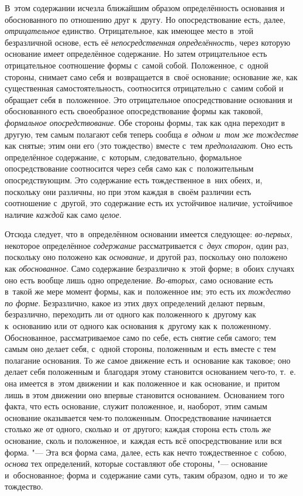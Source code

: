 В~этом содержании исчезла ближайшим образом определённость основания и
обоснованного по отношению друг к~другу. Но опосредствование есть, далее,
{\em отрицательное} единство. Отрицательное, как имеющее место в~этой
безразличной основе, есть её {\em непосредственная определённость,} через
которую основание имеет определённое содержание. Но затем отрицательное есть
отрицательное соотношение формы с~самой собой. Положенное, с~одной стороны,
снимает само себя и~возвращается в~своё основание; основание же, как
существенная самостоятельность, соотносится отрицательно с~самим собой и
обращает себя в~положенное. Это отрицательное опосредствование основания и
обоснованного есть своеобразное опосредствование формы как таковой,
{\em формальное опосредствование}. Обе стороны формы, так как одна переходит в
другую, тем самым полагают себя теперь сообща {\em в~одном и~том же тождестве}
как снятые; этим они его (это тождество) вместе с~тем {\em предполагают}. Оно
есть определённое содержание, с~которым, следовательно, формальное
опосредствование соотносится через себя само как с~положительным
опосредствующим. Это содержание есть тождественное в~них обеих, и, поскольку
они различны, но при этом каждая в~своём различии есть соотношение с~другой,
это содержание есть их устойчивое наличие, устойчивое наличие {\em каждой} как
само {\em целое}.

Отсюда следует, что в~определённом основании имеется следующее:
{\em во-первых,} некоторое определённое {\em содержание} рассматривается
с~{\em двух сторон,} один раз, поскольку оно положено как {\em основание,} и
другой раз, поскольку оно положено как {\em обоснованное}. Само содержание
безразлично к~этой форме; в~обоих случаях оно есть вообще лишь одно
определение. {\em Во-вторых,} само основание есть в~такой же мере момент формы,
как и~положенное им; это есть их {\em тождество по форме}. Безразлично, какое
из этих двух определений делают первым, безразлично, переходить ли от одного
как положенного к~другому как к~основанию или от одного как основания к~другому
как к~положенному. Обоснованное, рассматриваемое само по себе, есть снятие себя
самого; тем самым оно делает себя, с~одной стороны, положенным и~есть вместе с
тем полагание основания. То же самое движение есть и~основание как таковое; оно
делает себя положенным и~благодаря этому становится основанием чего-то, т.~е.
она имеется в~этом движении и~как положенное и~как основание, и~притом лишь в
этом движении оно впервые становится основанием. Основанием того факта, что
есть основание, служит положенное, и, наоборот, этим самым основание
оказывается чем-то положенным. Опосредствование начинается столько же от
одного, сколько и~от другого; каждая сторона есть столь же основание, сколь и
положенное, и~каждая есть всё опосредствование или вся форма. "--- Эта вся
форма сама, далее, есть как нечто тождественное с~собою, {\em основа} тех
определений, которые составляют обе стороны, "--- основание и~обоснованное;
форма и~содержание сами суть, таким образом, одно и~то же тождество.

